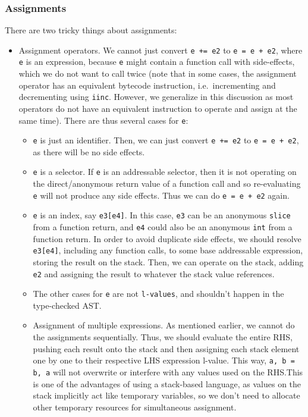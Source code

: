 \documentclass[11pt]{article}
\begin{document}
\subsubsection{Assignments}
There are two tricky things about assignments:
\begin{itemize}[noitemsep]
\item Assignment operators. We cannot just convert \texttt{e += e2} to
  \texttt{e = e + e2}, where \texttt{e} is an expression, because
  \texttt{e} might contain a function call with side-effects, which we
  do not want to call twice (note that in some cases, the assignment
  operator has an equivalent bytecode instruction, i.e.\ incrementing
  and decrementing using \texttt{iinc}. However, we generalize in this
  discussion as most operators do not have an equivalent instruction
  to operate and assign at the same time). There are thus several
  cases for \texttt{e}:
  \begin{itemize}[noitemsep]
  \item \texttt{e} is just an identifier. Then, we can just convert
    \texttt{e += e2} to \texttt{e = e + e2}, as there will be no side
    effects.
  \item \texttt{e} is a selector. If \texttt{e} is an addressable
    selector, then it is not operating on the direct/anonymous return
    value of a function call and so re-evaluating \texttt{e} will not
    produce any side effects. Thus we can do \texttt{e = e + e2}
    again.
  \item \texttt{e} is an index, say \texttt{e3[e4]}. In this case,
    \texttt{e3} can be an anonymous \texttt{slice} from a function
    return, and \texttt{e4} could also be an anonymous \texttt{int}
    from a function return. In order to avoid duplicate side effects,
    we should resolve \texttt{e3[e4]}, including any function calls,
    to some base addressable expression, storing the result on the
    stack. Then, we can operate on the stack, adding \texttt{e2} and
    assigning the result to whatever the stack value references.
  \item The other cases for \texttt{e} are not \texttt{l-values}, and
    shouldn't happen in the type-checked AST.\@
  \end{itemize}
  \begin{itemize}
  \item Assignment of multiple expressions. As mentioned earlier, we
    cannot do the assignments sequentially. Thus, we should evaluate
    the entire RHS, pushing each result onto the stack and then
    assigning each stack element one by one to their respective LHS
    expression l-value. This way, \texttt{a, b = b, a} will not
    overwrite or interfere with any values used on the RHS.\@ This is
    one of the advantages of using a stack-based language, as values
    on the stack implicitly act like temporary variables, so we don't
    need to allocate other temporary resources for simultaneous
    assignment.
  \end{itemize}
\end{itemize}
\end{document}
